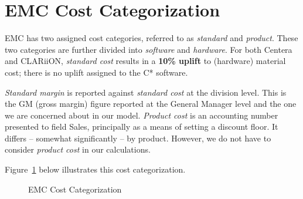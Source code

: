 \section{EMC Cost Categorization}\label{emc-cost-categorization-1}

EMC has two assigned cost categories, referred to as \emph{standard} and \emph{product}. These two categories are further divided into \emph{software} and \emph{hardware}. For both Centera and CLARiiON, \emph{standard cost} results in a \textbf{10\% uplift} to (hardware) material cost; there is no uplift assigned to the C* software.

\emph{Standard margin} is reported against \emph{standard cost} at the division level. This is the GM (gross margin) figure reported at the General Manager level and the one we are concerned about in our model. \emph{Product cost} is an accounting number presented to field Sales, principally as a means of setting a discount floor. It differs -- somewhat significantly -- by product. However, we do not have to consider \emph{product cost} in our calculations.

Figure~\ref{fig:cost} below illustrates this cost categorization.


\begin{figure}[htbp]
\centering
\resizebox{.85\linewidth}{!}{}

\caption{EMC Cost Categorization}\label{fig:cost}
\end{figure}
